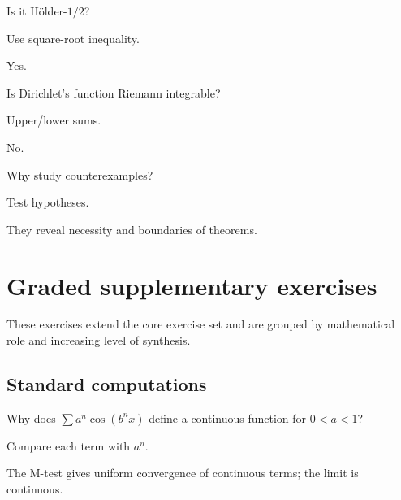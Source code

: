 \begin{exercise}\label{exr:ii15-06}
Is it Hölder-$1/2$?
\end{exercise}
\begin{hint}
Use square-root inequality.
\end{hint}
\begin{solution}
Yes.
\end{solution}

\begin{exercise}\label{exr:ii15-07}
Is Dirichlet's function Riemann integrable?
\end{exercise}
\begin{hint}
Upper/lower sums.
\end{hint}
\begin{solution}
No.
\end{solution}

\begin{exercise}\label{exr:ii15-08}
Why study counterexamples?
\end{exercise}
\begin{hint}
Test hypotheses.
\end{hint}
\begin{solution}
They reveal necessity and boundaries of theorems.
\end{solution}


\section{Graded supplementary exercises}
These exercises extend the core exercise set and are grouped by mathematical role and increasing level of synthesis.

\subsection*{Standard computations}

\begin{exercise}\label{exr:ii15-expand-01}
Why does \(\sum a^n\cos(b^nx)\) define a continuous function for \(0<a<1\)?
\end{exercise}
\begin{hint}
Compare each term with \(a^n\).
\end{hint}
\begin{solution}
The M-test gives uniform convergence of continuous terms; the limit is continuous.
\end{solution}


